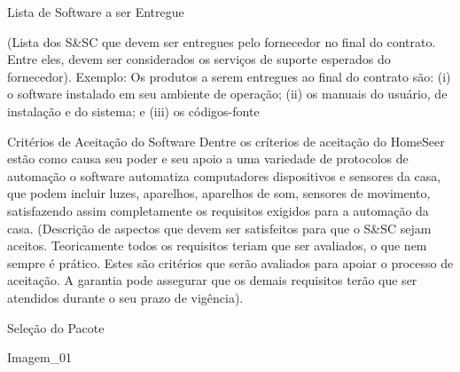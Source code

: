Lista de Software a ser Entregue

        (Lista dos S\&SC que devem ser entregues pelo fornecedor no final do contrato. Entre eles, devem ser considerados os serviços de suporte esperados do fornecedor). 
Exemplo: Os produtos a serem entregues ao final do contrato são: (i) o software instalado em seu ambiente de operação; (ii) os manuais do usuário, de instalação e do sistema; e (iii) os códigos-fonte  






Critérios de Aceitação do Software
Dentre os críterios de aceitação do HomeSeer  estão como causa  seu poder e seu apoio a uma variedade de protocolos de automação o software automatiza computadores dispositivos e sensores da casa, que podem incluir luzes, aparelhos, aparelhos de som, sensores de movimento, satisfazendo assim completamente os requisitos exigidos para a automação da casa. 
(Descrição de aspectos que devem ser satisfeitos para que o S\&SC sejam aceitos. Teoricamente todos os requisitos teriam que ser avaliados, o que nem sempre é prático. Estes são critérios que serão avaliados para apoiar o processo de aceitação. A garantia pode assegurar que os demais requisitos terão que ser atendidos durante o seu prazo de vigência). 

Seleção do Pacote


Imagem\_01
